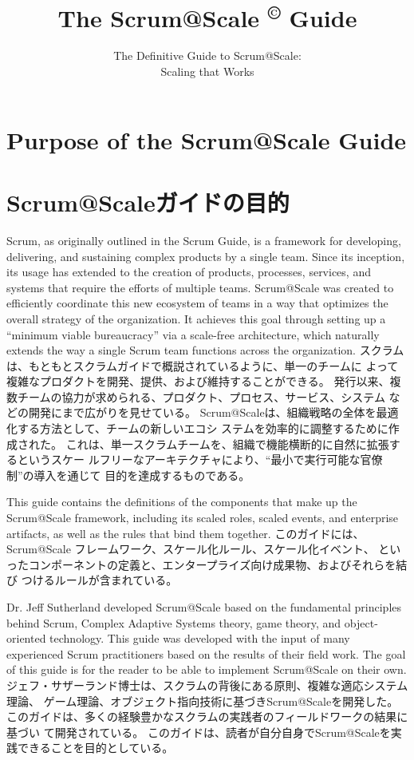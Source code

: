 \documentclass[12pt,a4paper,parskip=full]{scrartcl}
\title{\Huge{\color{red}\textbf{The Scrum@Scale
\textsuperscript{\copyright}
Guide}}}
\subtitle{\color{gray}The Definitive Guide to Scrum@Scale:\\ Scaling that
Works}
\date{}
\begin{document}

\section{Purpose of the Scrum@Scale Guide}
\fi
\section{Scrum@Scaleガイドの目的}
Scrum, as originally outlined in the Scrum Guide, is a framework for
developing, delivering, and sustaining complex products by a single team.
Since its inception, its usage has extended to the creation of products,
processes, services, and systems that require the efforts of multiple
teams. Scrum@Scale was created to efficiently coordinate this new ecosystem
of teams in a way that optimizes the overall strategy of the organization.
It achieves this goal through setting up a ``minimum viable bureaucracy''
via a scale-free architecture, which naturally extends the way a single
Scrum team functions across the organization.
\fi
スクラムは、もともとスクラムガイドで概説されているように、単一のチームに
よって複雑なプロダクトを開発、提供、および維持することができる。
発行以来、複数チームの協力が求められる、プロダクト、プロセス、サービス、システム
などの開発にまで広がりを見せている。
Scrum@Scaleは、組織戦略の全体を最適化する方法として、チームの新しいエコシ
ステムを効率的に調整するために作成された。
これは、単一スクラムチームを、組織で機能横断的に自然に拡張するというスケー
ルフリーなアーキテクチャにより、``最小で実行可能な官僚制''の導入を通じて
目的を達成するものである。

This guide contains the definitions of the components that make up the
Scrum@Scale framework, including its scaled roles, scaled events, and
enterprise artifacts, as well as the rules that bind them together.
\fi
このガイドには、Scrum@Scale フレームワーク、スケール化ルール、スケール化イベント、
といったコンポーネントの定義と、エンタープライズ向け成果物、およびそれらを結び
つけるルールが含まれている。

Dr. Jeff Sutherland developed Scrum@Scale based on the fundamental
principles behind Scrum, Complex Adaptive Systems theory, game theory, and
object-oriented technology. This guide was developed with the input of many
experienced Scrum practitioners based on the results of their field work.
The goal of this guide is for the reader to be able to implement Scrum@Scale
on their own.
\fi
ジェフ・サザーランド博士は、スクラムの背後にある原則、複雑な適応システム理論、
ゲーム理論、オブジェクト指向技術に基づきScrum@Scaleを開発した。
このガイドは、多くの経験豊かなスクラムの実践者のフィールドワークの結果に基づい
て開発されている。
このガイドは、読者が自分自身でScrum@Scaleを実践できることを目的としている。
\end{document}
